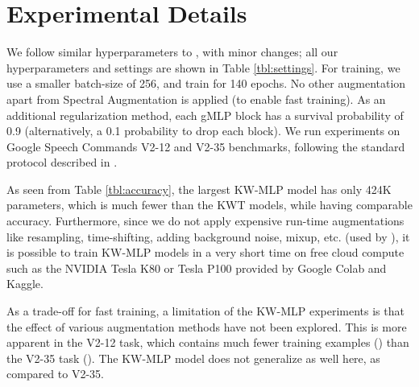 \documentclass{article} \usepackage{iclr2022_conference,times}
\begin{document}
\section{Experimental Details}
We follow similar hyperparameters to \citet{rybakov2020streaming,berg21_interspeech}, with minor changes; all our hyperparameters and settings are shown in Table \ref{tbl:settings}. For training, we use a smaller batch-size of 256, and train for 140 epochs. No other augmentation apart from Spectral Augmentation \citep{park2019specaugment} is applied (to enable fast training). As an additional regularization method, each gMLP block has a survival probability of 0.9 (alternatively, a 0.1 probability to drop each block). We run experiments on Google Speech Commands V2-12 and V2-35 benchmarks, following the standard protocol described in \citet{warden2018speech}.

As seen from Table \ref{tbl:accuracy}, the largest KW-MLP model has only 424K parameters, which is much fewer than the KWT models, while having comparable accuracy. Furthermore, since we do not apply expensive run-time augmentations like resampling, time-shifting, adding background noise, mixup, etc. (used by \citep{rybakov2020streaming,berg21_interspeech,gong2021ast}), it is possible to train KW-MLP models in a very short time on free cloud compute such as the NVIDIA Tesla K80 or Tesla P100 provided by Google Colab and Kaggle. 

As a trade-off for fast training, a limitation of the KW-MLP experiments is that the effect of various augmentation methods have not been explored. This is more apparent in the V2-12 task, which contains much fewer training examples () than the V2-35 task (). The KW-MLP model does not generalize as well here, as compared to V2-35.
\end{document}
